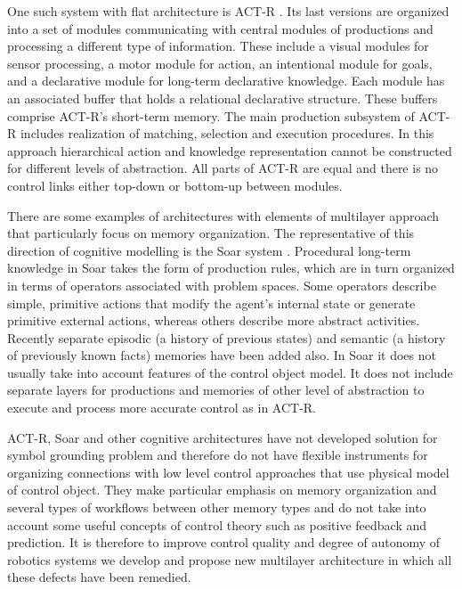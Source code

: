 \documentclass[review]{elsarticle}
\begin{document}
One such system with flat architecture is ACT-R \cite{Anderson2004,Langley2009}. Its last versions are organized into a set of modules communicating with central modules of productions and processing a different type of information. These include a visual modules for sensor processing, a motor module for action, an intentional module for goals, and a declarative module for long-term declarative knowledge. Each module has an associated buffer that holds a relational declarative structure. These buffers comprise ACT-R's short-term memory. The main production subsystem of ACT-R includes realization of matching, selection and execution procedures. In this approach hierarchical action and knowledge representation cannot be constructed for different levels of abstraction. All parts of ACT-R are equal and there is no control links either top-down or bottom-up between modules.

There are some examples of architectures with elements of multilayer approach that particularly focus on memory organization. The representative of this direction of cognitive modelling is the Soar system \cite{Laird2012,Derbinsky2010}. Procedural long-term knowledge in Soar takes the form of production rules, which are in turn organized in terms of operators associated with problem spaces. Some operators describe simple, primitive actions that modify the agent's internal state or generate primitive external actions, whereas others describe more abstract activities. Recently separate episodic (a history of previous states) and semantic (a history of previously known facts) memories have been added also. In Soar it does not usually take into account features of the control object model. It does not include separate layers for productions and memories of other level of abstraction to execute and process more accurate control as in ACT-R.

ACT-R, Soar and other cognitive architectures have not developed solution for symbol grounding problem \cite{Harnad1990,Barsalou1999} and therefore do not have flexible instruments for organizing connections with low level control approaches that use physical model of control object. They make particular emphasis on memory organization and several types of workflows between other memory types and do not take into account some useful concepts of control theory such as positive feedback and prediction. It is therefore to improve control quality and degree of autonomy of robotics systems we develop and propose new multilayer architecture in which all these defects have been remedied.
\end{document}
